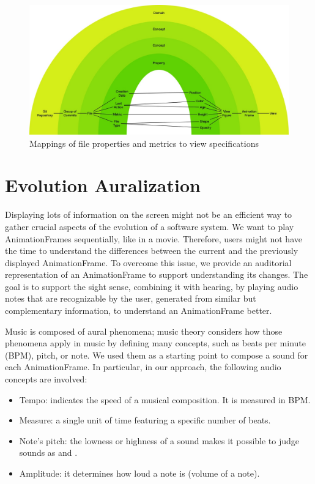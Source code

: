 \begin{figure}
    \center
    \includegraphics[width=\textwidth]{ApproachMapping.jpg}
    \caption{Mappings of file properties and metrics to view specifications}
    \label{fig:ApproachMapping}
\end{figure}



\section{Evolution Auralization}
\label{sec:audioApproach}
Displaying lots of information on the screen might not be an efficient way to gather crucial aspects of the evolution of a software system. We want to play AnimationFrames sequentially, like in a movie. Therefore, users might not have the time to understand the differences between the current and the previously displayed AnimationFrame. To overcome this issue, we provide an auditorial representation of an AnimationFrame to support understanding its changes. The goal is to support the sight sense, combining it with hearing, by playing audio notes that are recognizable by the user, generated from similar but complementary information, to understand an AnimationFrame better. 

Music is composed of aural phenomena; music theory considers how those phenomena apply in music by defining many concepts, such as beats per minute (BPM), pitch, or note.
We used them as a starting point to compose a sound for each AnimationFrame. In particular, in our approach, the following audio concepts are involved:
\begin{itemize}
    \item Tempo: indicates the speed of a musical composition. It is measured in BPM. 
    \item Measure: a single unit of time featuring a specific number of beats. 
	\item Note's pitch:  the lowness or highness of a sound makes it possible to judge sounds as  and .
	\item Amplitude: it determines how loud a note is (volume of a note).
\end{itemize}

